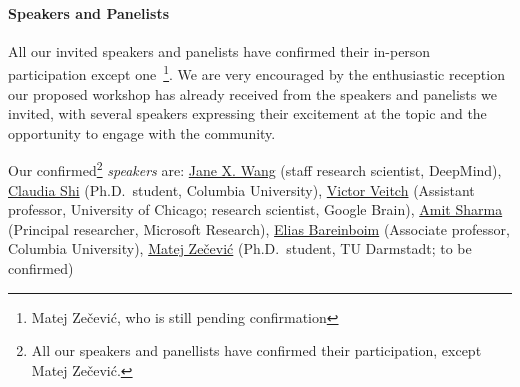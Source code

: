 \documentclass{article}
\begin{document}




\paragraph{Speakers and Panelists}

All our invited speakers and panelists have confirmed their in-person participation except one~\footnote{Matej Zečević, who is still pending confirmation}.
We are very encouraged by the enthusiastic reception our proposed workshop has already received from the speakers and panelists we invited, with several speakers expressing their excitement at the topic and the opportunity to engage with the community.



Our confirmed\footnote{All our speakers and panellists have confirmed their participation, except Matej Zečević.} \textit{speakers} are: 
\href{https://www.janexwang.com/}{Jane X. Wang} (staff research scientist, DeepMind),
\href{https://www.claudiajshi.com/}{Claudia Shi} (Ph.D.\ student, Columbia University),
\href{http://victorveitch.com/}{Victor Veitch} (Assistant professor, University of Chicago; research scientist, Google Brain),
\href{https://amitsharma.in/}{Amit Sharma} (Principal researcher, Microsoft Research),
\href{https://causalai.net/}{Elias Bareinboim} (Associate professor, Columbia University), 
\href{https://www.matej-zecevic.de/}{Matej Zečević} (Ph.D.\ student, TU Darmstadt; to be confirmed)
\end{document}

